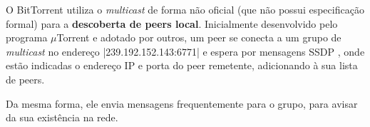 O BitTorrent utiliza o \emph{multicast} de forma não oficial (que não possui
especificação formal) para a \textbf{descoberta de \glspl*{peer} local}. Inicialmente
desenvolvido pelo programa $\mu$Torrent e adotado por outros, um \gls*{peer} se
conecta a um grupo de \emph{multicast} no endereço \sverb|239.192.152.143:6771| e
espera por mensagens SSDP \cite{site:utorrent-forum}, onde estão indicadas o endereço
IP e porta do \gls*{peer} remetente, adicionando à sua lista de \glspl*{peer}.


Da mesma forma, ele envia mensagens frequentemente para o grupo, para avisar da sua
existência na rede.

